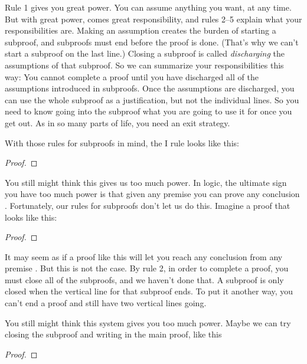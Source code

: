 Rule 1 gives you great power. You can assume anything you want, at any time. But with great power, comes great responsibility, and rules 2--5 explain what your responsibilities are. Making an assumption creates the burden of starting a subproof, and subproofs must end before the proof is done. (That's why we can't start a subproof on the last line.) Closing a subproof is called \emph{discharging} the assumptions of that subproof. So we can summarize your responsibilities this way: You cannot complete a proof until you have discharged all of the assumptions introduced in subproofs. Once the assumptions are discharged, you can use the whole subproof as a justification, but not the individual lines. So you need to know going into the subproof what you are going to use it for once you get out. As in so many parts of life, you need an exit strategy.  

With those rules for subproofs in mind, the {\eif}I rule looks like this:

\begin{proof}
	\open
		 
	\close
\end{proof}

You still might think this gives us too much power. In logic, the ultimate sign you have too much power is that given any premise  you can prove any conclusion . Fortunately, our rules for subproofs don't let us do this. Imagine a proof that looks like this:

\begin{proof}
	\open
\end{proof}

It may seem as if a proof like this will let you reach any conclusion  from any premise . But this is not the case. By rule 2, in order to complete a proof, you must close all of the subproofs, and we haven't done that. A subproof is only closed when the vertical line for that subproof ends. To put it another way, you  can't end a proof and still have two vertical lines going. 

You still might think this system gives you too much power. Maybe we can try closing the subproof and writing  in the main proof, like this 

\begin{proof}
	\open
		 
	\close
	 
\end{proof}

